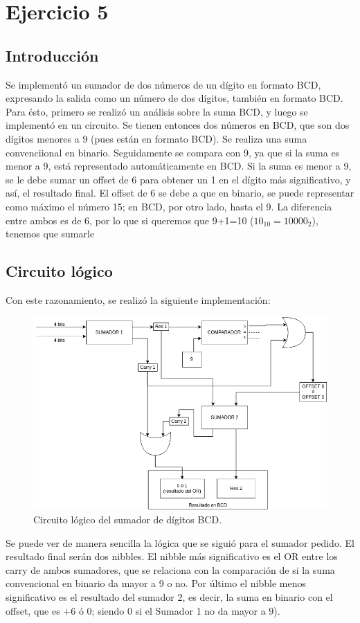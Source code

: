 \section{Ejercicio 5}
\subsection{Introducción}

Se implementó un sumador de dos números de un dígito en formato BCD, expresando la salida como un número de dos dígitos, también en formato BCD.
Para ésto, primero se realizó un análisis sobre la suma BCD, y luego se implementó en un circuito.
Se tienen entonces dos números en BCD, que son dos dígitos menores a 9 (pues están en formato BCD). Se realiza una suma convenciional en binario. Seguidamente se compara con 9, ya que si la suma es menor a 9, está representado automáticamente en BCD.
Si la suma es menor a 9, se le debe sumar un offset de 6 para obtener un 1 en el dígito más significativo, y así, el resultado final. 
El offset de 6 se debe a que en binario, se puede representar como máximo el número 15; en BCD, por otro lado, hasta el 9.
La diferencia entre ambos es de 6, por lo que si queremos que 9+1=10 ($10_{10}=1 0000_{2}$), tenemos que sumarle 
\subsection{Circuito lógico}
Con este razonamiento, se realizó la siguiente implementación:
\begin{figure}[H]
    \begin{center}
        \caption{Circuito lógico del sumador de dígitos BCD.}
\includegraphics[scale=0.5]{circuito.png}
    \end{center}
\end{figure}

Se puede ver de manera sencilla la lógica que se siguió para el sumador pedido. El resultado final serán dos nibbles. El nibble más significativo es el OR entre los carry de ambos sumadores, que se relaciona con la comparación de si la suma convencional 
en binario da mayor a 9 o no. Por último el nibble menos significativo es el resultado del sumador 2, es decir, la suma en binario con el offset, que es $+6$ ó $0$; siendo $0$ si el Sumador 1 no da mayor a $9$).